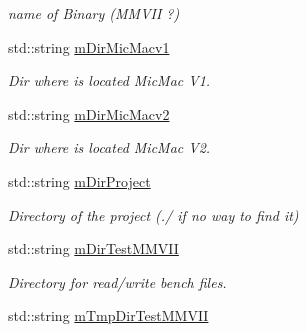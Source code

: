\begin{DoxyCompactItemize}
\begin{DoxyCompactList}\small\item\em name of Binary (M\+M\+V\+II ?) \end{DoxyCompactList}\item 
std\+::string \hyperlink{classMMVII_1_1cMMVII__Appli_a69a001ef3961c299565379e976204226}{m\+Dir\+Mic\+Macv1}\hypertarget{classMMVII_1_1cMMVII__Appli_a69a001ef3961c299565379e976204226}{}\label{classMMVII_1_1cMMVII__Appli_a69a001ef3961c299565379e976204226}

\begin{DoxyCompactList}\small\item\em Dir where is located Mic\+Mac V1. \end{DoxyCompactList}\item 
std\+::string \hyperlink{classMMVII_1_1cMMVII__Appli_afb10abdb211aa0681b83cb9c221a1cb3}{m\+Dir\+Mic\+Macv2}\hypertarget{classMMVII_1_1cMMVII__Appli_afb10abdb211aa0681b83cb9c221a1cb3}{}\label{classMMVII_1_1cMMVII__Appli_afb10abdb211aa0681b83cb9c221a1cb3}

\begin{DoxyCompactList}\small\item\em Dir where is located Mic\+Mac V2. \end{DoxyCompactList}\item 
std\+::string \hyperlink{classMMVII_1_1cMMVII__Appli_ac499a1136b5261fb82e1ac0fb9632fdc}{m\+Dir\+Project}\hypertarget{classMMVII_1_1cMMVII__Appli_ac499a1136b5261fb82e1ac0fb9632fdc}{}\label{classMMVII_1_1cMMVII__Appli_ac499a1136b5261fb82e1ac0fb9632fdc}

\begin{DoxyCompactList}\small\item\em Directory of the project (./ if no way to find it) \end{DoxyCompactList}\item 
std\+::string \hyperlink{classMMVII_1_1cMMVII__Appli_a9915f4fb5db78908623d30364e13d6a5}{m\+Dir\+Test\+M\+M\+V\+II}\hypertarget{classMMVII_1_1cMMVII__Appli_a9915f4fb5db78908623d30364e13d6a5}{}\label{classMMVII_1_1cMMVII__Appli_a9915f4fb5db78908623d30364e13d6a5}

\begin{DoxyCompactList}\small\item\em Directory for read/write bench files. \end{DoxyCompactList}\item 
std\+::string \hyperlink{classMMVII_1_1cMMVII__Appli_a1581c90a633a9d985c76bd17f7b38a10}{m\+Tmp\+Dir\+Test\+M\+M\+V\+II}\hypertarget{classMMVII_1_1cMMVII__Appli_a1581c90a633a9d985c76bd17f7b38a10}{}\label{classMMVII_1_1cMMVII__Appli_a1581c90a633a9d985c76bd17f7b38a10}


\end{DoxyCompactItemize}
